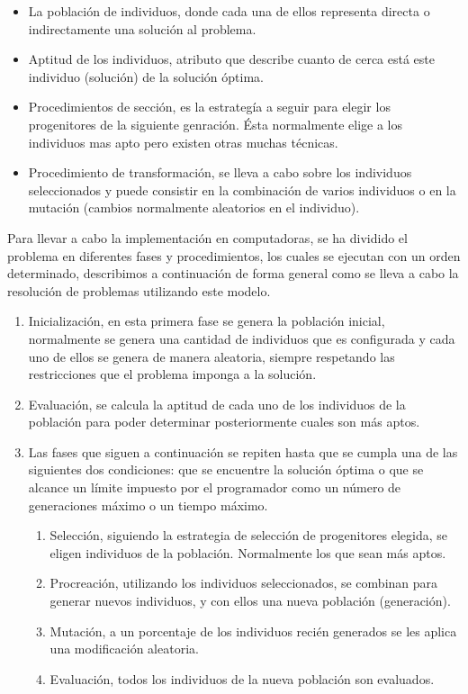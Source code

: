 \begin{itemize}
	\item La población de individuos, donde cada una de ellos representa directa o indirectamente una solución al problema.
	\item Aptitud de los individuos, atributo que describe cuanto de cerca est\'a este individuo (solución) de la solución \'optima. 
	\item Procedimientos de sección, es la estrateg\'ia a seguir para elegir los progenitores de la siguiente genraci\'on. \'Esta normalmente elige a los individuos mas apto pero existen otras muchas técnicas.
	\item Procedimiento de transformaci\'on, se lleva a cabo sobre los individuos seleccionados y puede consistir en la combinación de varios individuos o en la mutación (cambios normalmente aleatorios en el individuo).
\end{itemize}

Para llevar a cabo la implementación en computadoras, se ha dividido el problema en diferentes fases y procedimientos, los cuales se ejecutan con un orden determinado, describimos a continuación de forma general como se lleva a cabo la resolución de problemas utilizando este modelo.

\begin{enumerate}
	\item Inicializaci\'on, en esta primera fase se genera la población inicial, normalmente se genera una cantidad de individuos que es configurada y cada uno de ellos se genera de manera aleatoria, siempre respetando las restricciones que el problema imponga a la solución.
	\item Evaluaci\'on, se calcula la aptitud de cada uno de los individuos de la población para poder determinar posteriormente cuales son m\'as aptos.
	\item Las fases que siguen a continuación se repiten hasta que se cumpla una de las siguientes dos condiciones: que se encuentre la solución \'optima o que se alcance un l\'imite impuesto por el programador como un n\'umero de generaciones máximo o un tiempo máximo.
	\begin{enumerate}
		\item Selección, siguiendo la estrategia de selección de progenitores elegida, se eligen individuos de la población. Normalmente los que sean m\'as aptos.
		\item Procreaci\'on, utilizando los individuos seleccionados, se combinan para generar nuevos individuos, y con ellos una nueva población (generación).
		\item Mutaci\'on, a un porcentaje de los individuos recién generados se les aplica una modificación aleatoria.
		\item Evaluaci\'on, todos los individuos de la nueva poblaci\'on son evaluados.
	\end{enumerate}
\end{enumerate}

